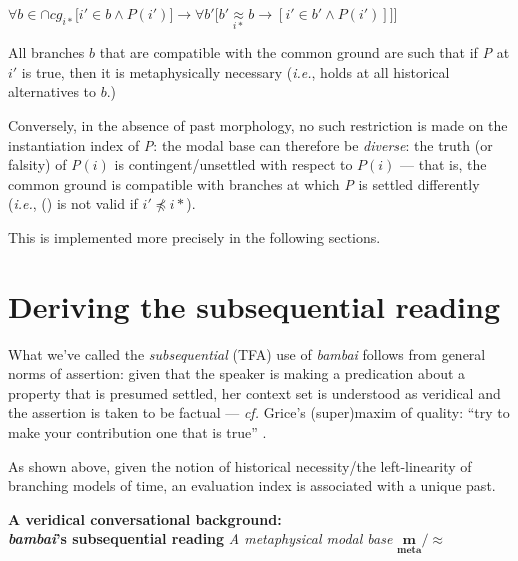 $ \forall b\in\cap\textit{cg}_{i*}\Big[i'\in b\wedge\textit{P}(i')]\to\forall b'\big[b'\underset{i*}{\approx} b\to[i'\in b'\wedge\textit{P}(i')]\big]\Big]$

All branches $ b $ that are compatible with the common ground are such that if \textit{P} at $ i' $ is true, then it is metaphysically necessary (\textit{i.e.}, holds at all historical alternatives to $ b $.)
\xe

Conversely, in the absence of past morphology, no such restriction is made on the instantiation index of \textit{P}: the modal base can therefore be \textit{diverse}: the truth (or falsity) of \textit{P$ (i) $} is contingent/unsettled with respect to $ P(i) $ --- that is, the common ground is compatible with branches at which \textit{P} is settled differently (\textit{i.e.}, (\lastx) is not valid if $ i'\not\preccurlyeq i* $).%


This is implemented more precisely in the following sections.

\section{Deriving the subsequential reading}
What we've called the \textit{subsequential} (TFA) use of \textit{bambai} follows from general norms of assertion: given that the speaker is making a predication about a property that is presumed settled, her context set is understood as veridical and the assertion is taken to be factual --- \textit{cf.} Grice's (super)maxim of quality: ``try to make your contribution one that is true'' \citeyearpar[27]{Grice1991}.


As shown above, given the notion of historical necessity/the left-linearity of branching models of time, an evaluation index is associated with a unique past.


\pex \textbf{A veridical conversational background:\\ \textit{bambai}'s subsequential reading}
\a \textit{A metaphysical modal base} $ \boldsymbol{\underset{\text{meta}}{m}/\approx }$

